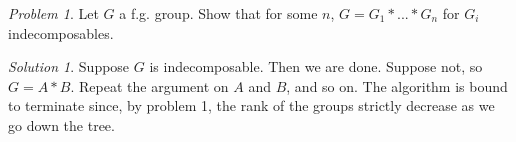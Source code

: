 \documentclass[11pt]{article}
\theoremstyle{definition}
\theoremstyle{example}
\theoremstyle{remark}
\theoremstyle{lemma}
\theoremstyle{proposition}
\theoremstyle{Problem}
\newtheorem{problem}{Problem}[section]
\theoremstyle{Solution}
\newtheorem{solution}{Solution}[section]
\theoremstyle{theorem}
\theoremstyle{corollary}
\begin{document}
\begin{problem}
Let $G$ a f.g. group. Show that for some $n$, $G=G_1*...*G_n$ for $G_i$ indecomposables.
\end{problem}
\begin{solution}
Suppose $G$ is indecomposable. Then we are done. Suppose not, so $G = A*B$. Repeat the argument on $A$ and $B$, and so on. The algorithm is bound to terminate since, by problem 1, the rank of the groups strictly decrease as we go down the tree.
\end{solution}
\end{document}
